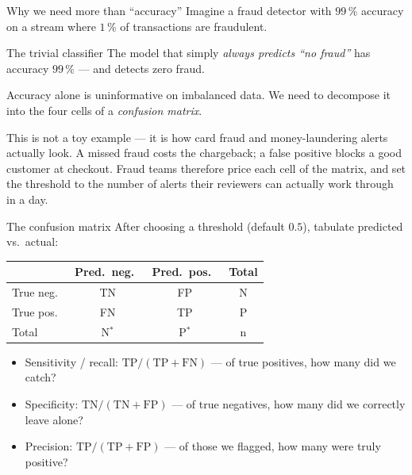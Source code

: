\documentclass[aspectratio=169,11pt]{beamer}
\begin{document}
\begin{frame}{Why we need more than ``accuracy''}
  Imagine a fraud detector with $99\,\%$ accuracy on a stream where
  $1\,\%$ of transactions are fraudulent.
  \begin{alertblock}{The trivial classifier}
    The model that simply \emph{always predicts ``no fraud''} has
    accuracy $99\,\%$ --- and detects zero fraud.
  \end{alertblock}
  \begin{takeaway}
    Accuracy alone is uninformative on imbalanced data. We need to
    decompose it into the four cells of a \emph{confusion matrix}.
  \end{takeaway}
  \begin{industry}
    This is not a toy example --- it is how card fraud and money-laundering alerts
    actually look. A missed fraud costs the chargeback; a false positive blocks a
    good customer at checkout. Fraud teams therefore price each cell of the
    matrix, and set the threshold to the number of alerts their reviewers can
    actually work through in a day.
  \end{industry}
\end{frame}

\begin{frame}{The confusion matrix}
  After choosing a threshold (default $0.5$), tabulate predicted vs.\
  actual:
  \begin{center}
  \begin{tabular}{l|cc|c}
    \toprule
    & Pred.\ neg.\ & Pred.\ pos.\ & Total \\
    \midrule
    True neg.\ & TN & FP & N \\
    True pos.\ & FN & TP & P \\
    \midrule
    Total & N$^*$ & P$^*$ & n \\
    \bottomrule
  \end{tabular}
  \end{center}
  \begin{readme}
    \begin{itemize}
      \item Sensitivity / recall: $\mathrm{TP}/(\mathrm{TP+FN})$ ---
            of true positives, how many did we catch?
      \item Specificity: $\mathrm{TN}/(\mathrm{TN+FP})$ --- of true
            negatives, how many did we correctly leave alone?
      \item Precision: $\mathrm{TP}/(\mathrm{TP+FP})$ --- of those we
            flagged, how many were truly positive?
    \end{itemize}
  \end{readme}
\end{frame}
\end{document}
